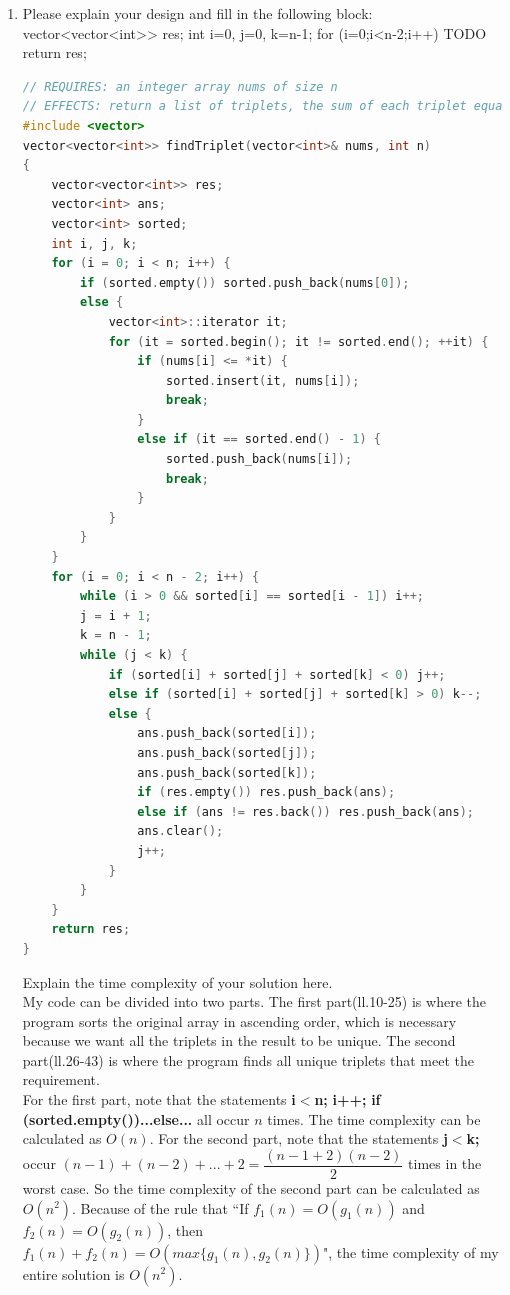 \documentclass[12pt,a4paper]{article}
\makeatletter
\newtheorem*{solution}{Solution}
\theoremstyle{definition}
\renewenvironment{solution}[1][Solution] {\par\pushQED{\qed}\normalfont\topsep6\p@\@plus6\p@\relax\trivlist\item[\hskip\labelsep\bfseries#1\@addpunct{.}]\ignorespaces}{\popQED\endtrivlist\@endpefalse} \makeatother
\makeatother
\begin{document}
\begin{enumerate}
\begin{solution}
Please explain your design and fill in the following block:
{
	vector<vector<int>> res;
	int i=0, j=0, k=n-1;
	for (i=0;i<n-2;i++)
	{
		TODO
	}
	return res;
}%
	\begin{lstlisting}[language=C++]
// REQUIRES: an integer array nums of size n
// EFFECTS: return a list of triplets, the sum of each triplet equals to 0.
#include <vector>
vector<vector<int>> findTriplet(vector<int>& nums, int n)
{
	vector<vector<int>> res;
	vector<int> ans;
	vector<int> sorted;
	int i, j, k;
	for (i = 0; i < n; i++) {
		if (sorted.empty()) sorted.push_back(nums[0]);
		else {
			vector<int>::iterator it;
			for (it = sorted.begin(); it != sorted.end(); ++it) {
				if (nums[i] <= *it) {
					sorted.insert(it, nums[i]);
					break;
				}
				else if (it == sorted.end() - 1) {
					sorted.push_back(nums[i]);
					break;
				}
			}
		}
	}
	for (i = 0; i < n - 2; i++) {
		while (i > 0 && sorted[i] == sorted[i - 1]) i++;
		j = i + 1;
		k = n - 1;
		while (j < k) {
			if (sorted[i] + sorted[j] + sorted[k] < 0) j++;
			else if (sorted[i] + sorted[j] + sorted[k] > 0) k--;
			else {
				ans.push_back(sorted[i]);
				ans.push_back(sorted[j]);
				ans.push_back(sorted[k]);
				if (res.empty()) res.push_back(ans);
				else if (ans != res.back()) res.push_back(ans);
				ans.clear();
				j++;
			}
		}
	}
	return res;
}
	\end{lstlisting}
Explain the time complexity of your solution here.\\
My code can be divided into two parts. The first part(ll.10-25) is where the program sorts the original array in ascending order, which is necessary because we want all the triplets in the result to be unique. The second part(ll.26-43) is where the program finds all unique triplets that meet the requirement.\\
For the first part, note that the statements \textbf{i$<$n;} \textbf{i++;} \textbf{if (sorted.empty())...else...} all occur $n$ times. The time complexity can be calculated as $O(n)$. For the second part, note that the statements \textbf{j$<$k;} occur $(n-1)+(n-2)+...+2=\dfrac{(n-1+2)(n-2)}{2}$ times in the worst case. So the time complexity of the second part can be calculated as $O(n^2)$. Because of the rule that “If $f_1(n)=O(g_1(n))$ and $f_2(n)=O(g_2(n))$, then $f_1(n)+f_2(n)=O(max\{g_1(n),g_2(n)\})$", the time complexity of my entire solution is $O(n^2)$.
\end{solution}


\end{enumerate}
\end{document}
